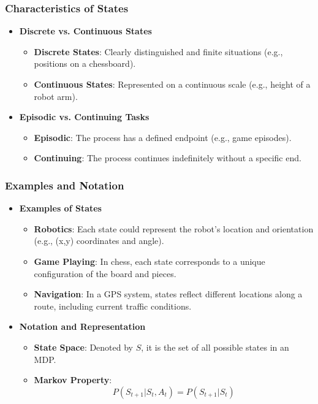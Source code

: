 \documentclass[aspectratio=169]{beamer}
\begin{document}
\begin{frame}[fragile]
    \frametitle{Characteristics of States}
    \begin{itemize}
        \item \textbf{Discrete vs. Continuous States}
            \begin{itemize}
                \item \textbf{Discrete States}: Clearly distinguished and finite situations (e.g., positions on a chessboard).
                \item \textbf{Continuous States}: Represented on a continuous scale (e.g., height of a robot arm).
            \end{itemize}
        
        \item \textbf{Episodic vs. Continuing Tasks}
            \begin{itemize}
                \item \textbf{Episodic}: The process has a defined endpoint (e.g., game episodes).
                \item \textbf{Continuing}: The process continues indefinitely without a specific end.
            \end{itemize}
    \end{itemize}
\end{frame}

\begin{frame}[fragile]
    \frametitle{Examples and Notation}
    \begin{itemize}
        \item \textbf{Examples of States}
            \begin{itemize}
                \item \textbf{Robotics}: Each state could represent the robot's location and orientation (e.g., (x,y) coordinates and angle).
                \item \textbf{Game Playing}: In chess, each state corresponds to a unique configuration of the board and pieces.
                \item \textbf{Navigation}: In a GPS system, states reflect different locations along a route, including current traffic conditions.
            \end{itemize}
        
        \item \textbf{Notation and Representation}
            \begin{itemize}
                \item \textbf{State Space}: Denoted by \( S \), it is the set of all possible states in an MDP.
                \item \textbf{Markov Property}:
                    \[
                    P(S_{t+1} | S_t, A_t) = P(S_{t+1} | S_t)
                    \]
            \end{itemize}
    \end{itemize}
\end{frame}
\end{document}
